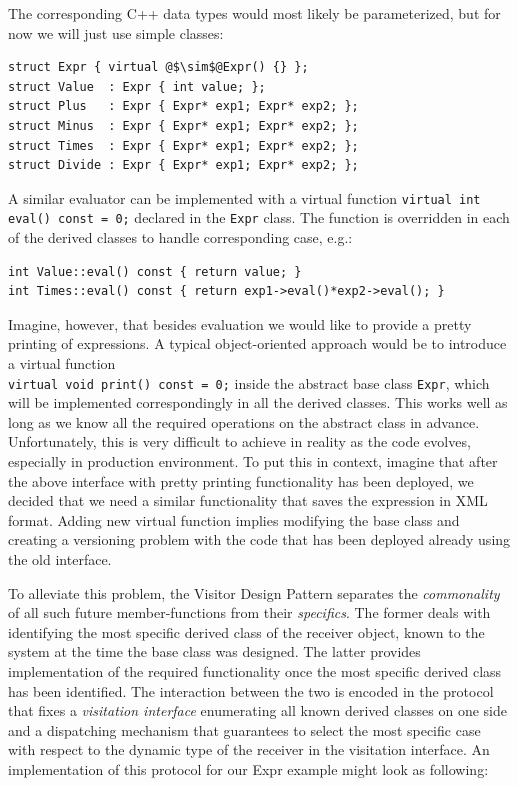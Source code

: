 \documentclass[preprint]{sigplanconf}
\makeatletter
\DeclareRobustCommand{\code}[1]{{\lstinline[breaklines=false,escapechar=@]{#1}}}
\makeatother
\begin{document}
\noindent
The corresponding C++ data types would most likely be parameterized, but for
now we will just use simple classes:

\begin{lstlisting}[keepspaces,columns=flexible]
struct Expr { virtual @$\sim$@Expr() {} };
struct Value  : Expr { int value; };
struct Plus   : Expr { Expr* exp1; Expr* exp2; };
struct Minus  : Expr { Expr* exp1; Expr* exp2; };
struct Times  : Expr { Expr* exp1; Expr* exp2; };
struct Divide : Expr { Expr* exp1; Expr* exp2; };
\end{lstlisting}

\noindent
A similar evaluator can be implemented with a virtual function \code{virtual int 
eval() const = 0;} declared in the \code{Expr} class. The function is overridden 
in each of the derived classes to handle corresponding case, e.g.:

\begin{lstlisting}[keepspaces,columns=flexible]
int Value::eval() const { return value; }
int Times::eval() const { return exp1->eval()*exp2->eval(); }
\end{lstlisting}

\noindent
Imagine, however, that besides evaluation we would like to provide a pretty 
printing of expressions. A typical object-oriented approach would be to 
introduce a virtual function \\ \code{virtual void print() const = 0;} inside 
the abstract base class \code{Expr}, which will be implemented correspondingly 
in all the derived classes. This works well as long as we know all the required  
operations on the abstract class in advance. Unfortunately, this is very 
difficult to achieve in reality as the code evolves, especially in production 
environment. To put this in context, imagine that after the above interface with 
pretty printing functionality has been deployed, we decided that we need a 
similar functionality that saves the expression in XML format. Adding new 
virtual function implies modifying the base class and creating a versioning 
problem with the code that has been deployed already using the old interface.

To alleviate this problem, the Visitor Design Pattern separates the 
\emph{commonality} of all such future member-functions from their 
\emph{specifics}. The former deals with identifying the most specific derived 
class of the receiver object, known to the system at the time the base class was 
designed. The latter provides implementation of the required functionality once 
the most specific derived class has been identified. The interaction between the 
two is encoded in the protocol that fixes a \emph{visitation interface} 
enumerating all known derived classes on one side and a dispatching mechanism 
that guarantees to select the most specific case with respect to the dynamic 
type of the receiver in the visitation interface. An implementation of this 
protocol for our Expr example might look as following:
\end{document}
